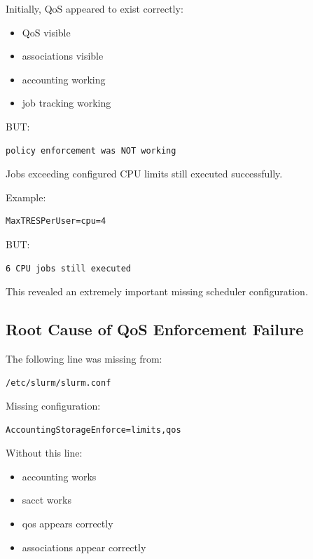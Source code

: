 \documentclass[11pt]{article}
\begin{document}
Initially, QoS appeared to exist correctly:

\begin{itemize}
\item QoS visible
\item associations visible
\item accounting working
\item job tracking working
\end{itemize}

BUT:

\begin{verbatim}
policy enforcement was NOT working
\end{verbatim}

Jobs exceeding configured CPU limits still executed successfully.

Example:

\begin{verbatim}
MaxTRESPerUser=cpu=4
\end{verbatim}

BUT:

\begin{verbatim}
6 CPU jobs still executed
\end{verbatim}

This revealed an extremely important missing scheduler configuration.
\subsection{Root Cause of QoS Enforcement Failure}
\label{sec:org4e20689}

The following line was missing from:

\begin{verbatim}
/etc/slurm/slurm.conf
\end{verbatim}

Missing configuration:

\begin{verbatim}
AccountingStorageEnforce=limits,qos
\end{verbatim}

Without this line:

\begin{itemize}
\item accounting works
\item sacct works
\item qos appears correctly
\item associations appear correctly
\end{itemize}
\end{document}

